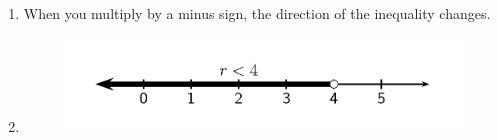 {\begin{mdframed}[linewidth=4, leftmargin=40, rightmargin=40]
\begin{exercise}
\begin{enumerate}[noitemsep, label=\textbf{Step} \textbf{\arabic*}. ]
{    }%
      \item  
      \label{m39254*id157909}When you multiply by a minus sign, the direction of the inequality changes.\par 
      \label{m39254*id157913}\nopagebreak\noindent{}
      \item  
      \label{m39254*id157934}
    \setcounter{subfigure}{0}
	\begin{figure}[H] %
    \begin{center}
    \label{m39254*id157937!!!underscore!!!media}\label{m39254*id157937!!!underscore!!!printimage}\includegraphics{col11306.imgs/m39254_MG10C10_003.png} %
      \vspace{2pt}
    \vspace{.1in}
    \end{center}
 \end{figure}       
      \par 
      \end{enumerate}
    \end{exercise}
    \end{mdframed}
    }
